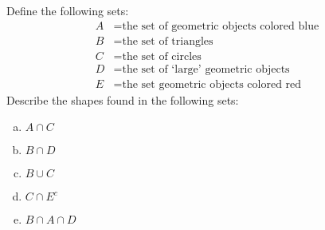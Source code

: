 \documentclass[11pt,letterpaper]{article}
\begin{document}

 Define the following sets:
	\[
	\begin{aligned}
	A&= \text{the set of geometric objects colored blue} \\
	B&= \text{the set of triangles} \\
	C&= \text{the set of circles} \\
	D&= \text{the set of `large' geometric objects} \\
	E&= \text{the set geometric objects colored red}
	\end{aligned}
	\]
Describe the shapes found in the following sets:
	\begin{enumerate}[(a)]
	\item $A \cap C$
	\item $B \cap D$
	\item $B \cup C$
	\item $C \cap E^c$
	\item $B \cap A \cap D$
	\end{enumerate} \pspace
\end{document}
